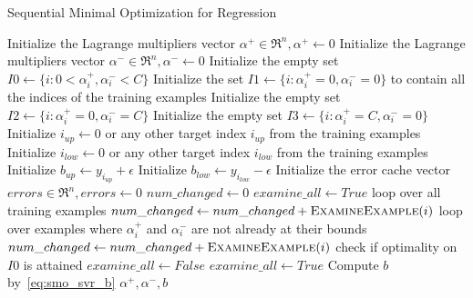 \begin{breakablealgorithm}
	\caption{Sequential Minimal Optimization for Regression}
	\label{alg:smo_regression}
	\begin{algorithmic}
			\State Initialize the Lagrange multipliers vector $\alpha^+ \in \Re^n, \alpha^+ \gets 0$
			\State Initialize the Lagrange multipliers vector $\alpha^- \in \Re^n, \alpha^- \gets 0$
			\State Initialize the empty set $I0 \gets \{i : 0 < \alpha^+_i, \alpha^-_i < C\}$
			\State Initialize the set $I1 \gets \{i : \alpha^+_i = 0, \alpha^-_i = 0\}$ to contain all the indices of the training examples
			\State Initialize the empty set $I2 \gets \{i : \alpha^+_i = 0, \alpha^-_i = C\}$
			\State Initialize the empty set $I3 \gets \{i : \alpha^+_i = C, \alpha^-_i = 0\}$
			\State Initialize $i_{up} \gets 0$ \Comment or any other target index $i_{up}$ from the training examples
			\State Initialize $i_{low} \gets 0$ \Comment or any other target index $i_{low}$ from the training examples
			\State Initialize $b_{up} \gets y_{i_{up}} + \epsilon$
			\State Initialize $b_{low} \gets y_{i_{low}} - \epsilon$
			\State Initialize the error cache vector $errors \in \Re^n, errors \gets 0$
				\State $num\_changed \gets 0$
				\State $examine\_all \gets True$
					 \Comment loop over all training examples
						\State $num\_changed \gets num\_changed + \Call{ExamineExample}{i}$
					\EndFor
				\Else
					 \Comment loop over examples where $\alpha^+_i$ and $\alpha^-_i$ are not already at their bounds
						\State $num\_changed \gets num\_changed + \Call{ExamineExample}{i}$
						 \Comment check if optimality on $I0$ is attained
							\Break
						\EndIf
					\EndFor
				\EndIf
					\State $examine\_all \gets False$
					\State $examine\_all \gets True$
				\EndIf
			\EndWhile
			\State Compute $b$ by~\eqref{eq:smo_svr_b}
			\State \Return $\alpha^+,\alpha^-,b$
		\EndFunction
	\end{algorithmic}
	

\end{breakablealgorithm}
